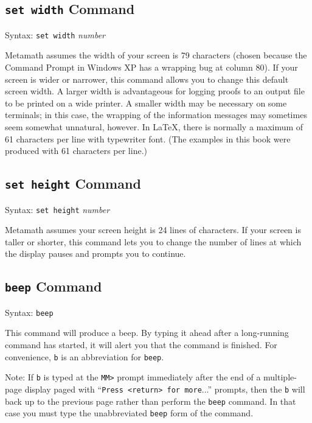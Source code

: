 \subsection{\texttt{set width} Command}
Syntax:  \texttt{set width} {\em number}

Metamath assumes the width of your screen is 79 characters (chosen
because the Command Prompt in Windows XP has a wrapping bug at column
80).  If your screen is wider or narrower, this command allows you to
change this default screen width.  A larger width is advantageous for
logging proofs to an output file to be printed on a wide printer.  A
smaller width may be necessary on some terminals; in this case, the
wrapping of the information messages may sometimes seem somewhat
unnatural, however.  In \LaTeX{},
there is normally a maximum of 61 characters per line with typewriter
font.  (The examples in this book were produced with 61 characters per
line.)

\subsection{\texttt{set height} Command}
Syntax:  \texttt{set height} {\em number}

Metamath assumes your screen height is 24 lines of characters.  If your
screen is taller or shorter, this command lets you to change the number
of lines at which the display pauses and prompts you to continue.

\subsection{\texttt{beep} Command}

Syntax:  \texttt{beep}

This command will produce a beep.  By typing it ahead after a
long-running command has started, it will alert you that the command is
finished.  For convenience, \texttt{b} is an abbreviation for
\texttt{beep}.

Note:  If \texttt{b} is typed at the \texttt{MM>} prompt immediately
after the end of a multiple-page display paged with ``\texttt{Press
<return> for more}...'' prompts, then the \texttt{b} will back up to the
previous page rather than perform the \texttt{beep} command.
In that case you must type the unabbreviated \texttt{beep} form
of the command.

